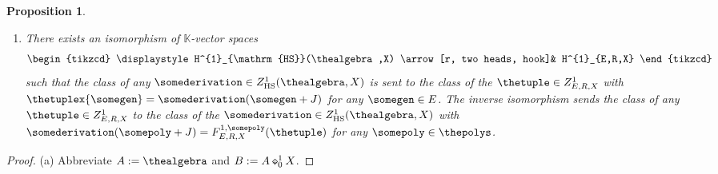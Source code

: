 \documentclass[10pt,a4paper]{amsart}
\numberwithin{equation}{section}
\newtheorem{Proposition}[Theorem]{Proposition}
{ \theoremstyle{definition}
\newtheorem{Definition}[Theorem]{Definition}
\newtheorem{Note}[Theorem]{Note}
\newtheorem{Example}[Theorem]{Example}
\newtheorem{Remark}[Theorem]{Remark}
\newtheorem{Notation}[Theorem]{Notation}
\newtheorem{Assumptions}[Theorem]{Assumptions}
}
\newcommand{\diamondplus}{\mathbin{\ooalign{\hfil$\diamond$\hfil\cr\hfil$\scriptscriptstyle+$\hfil\cr}}}
\newcommand{\HSalgebraconstructdeform}[4]{#2\diamondplus^{#1}_{#4}#3}
\newcommand{\HScocycles}[3]{Z^{#1}_{\mathrm{HS}}(#2,#3)}
\newcommand{\HScoboundaries}[3]{B^{#1}_{\mathrm{HS}}(#2,#3)}
\newcommand{\HScohomology}[3]{H^{#1}_{\mathrm{HS}}(#2,#3)}
\newcommand{\HSuacocycles}[4]{Z^{#1}_{#2,#3,#4}}
\newcommand{\HSuacoboundaries}[4]{B^{#1}_{#2,#3,#4}}
\newcommand{\HSuacohomology}[4]{H^{#1}_{#2,#3,#4}}
\newcommand{\HSuafuncxx}[6]{F^{#1,#5}_{#2,#3,#4}(#6)}
\newcommand{\fromto}[2]{#1 \to #2}
\newcommand{\thegens}{E}
\newcommand{\therels}{R}
\newcommand{\theideal}{J}
\newcommand{\thefield}{\mathbb{K}}
\newcommand{\themodule}{X}
\begin{document}
{{\begin{Proposition}
\begin{enumerate}
        A commutative diagram of $\thefield$-linear maps is given by
            $$
                    \begin{tikzcd}
\HScocycles{1}{\thealgebra}{\themodule}\arrow[r, two heads, hook]& \HSuacocycles{1}{\thegens}{\therels}{\themodule}\\
\HScoboundaries{1}{\thealgebra}{\themodule}\arrow[r, two heads, hook]\arrow[u,hook, "\subseteq" left]& \HSuacoboundaries{1}{\thegens}{\therels}{\themodule},\arrow[u,hook, "\subseteq" right]
            \end{tikzcd}
          $$
          where the horizontal arrows both assign to  any element $\somederivation$ of their respective domains the tuple
          \[
            (\somederivation(\somegen+\theideal))_{\somegen\in\thegens}.
          \]
          Moreover, the horizontal arrows are both $\thefield$-linear isomorphisms. Their respective inverses both assign to any element $\thetuple$ of their respective domains the mapping $\fromto{\thealgebra}{\themodule}$ with
          \[
           \somepoly+\theideal\mapsto \HSuafuncxx{1}{\thegens}{\therels}{\themodule}{\somepoly}{\thetuple}
          \]
           for any $\somepoly\in\thepolys$.
      \item      \label{proposition:hochschild-particular-one-cohomology-2}
          There exists an isomorphism of $\thefield$-vector spaces
    \[
      \begin{tikzcd}
        \displaystyle
        \HScohomology{1}{\thealgebra}{\themodule} \arrow[r, two heads, hook]&        \HSuacohomology{1}{\thegens}{\therels}{\themodule}
      \end{tikzcd}
    \]
    such that the class of any $\somederivation\in\HScocycles{1}{\thealgebra}{\themodule}$ is sent to the class of the $\thetuple\in \HSuacocycles{1}{\thegens}{\therels}{\themodule}$ with $\thetuplex{\somegen}=\somederivation(\somegen+\theideal)$ for any $\somegen\in\thegens$.
The inverse isomorphism sends the class of any $\thetuple\in \HSuacocycles{1}{\thegens}{\therels}{\themodule}$  to the class of the $\somederivation\in \HScocycles{1}{\thealgebra}{\themodule}$ with $\somederivation(\somepoly+\theideal)=\HSuafuncxx{1}{\thegens}{\therels}{\themodule}{\somepoly}{\thetuple}$ for any $\somepoly\in\thepolys$.
      \end{enumerate}
               \end{Proposition}
               \begin{proof}
           \newcommand{\shortalgebra}{A}
           \newcommand{\somealgebra}{B}
           \newcommand{\anycocycle}{\eta}
           \newcommand{\anyop}{a}
           \newcommand{\somemorph}{f}
           \newcommand{\horimorph}{\varphi}
           \newcommand{\invhorimorph}{\psi}
(a)
           Abbreviate $\shortalgebra:=\thealgebra$ and  $\somealgebra:=\HSalgebraconstructdeform{1}{\shortalgebra}{\themodule}{0}$.


\end{proof}}}
\end{document}
